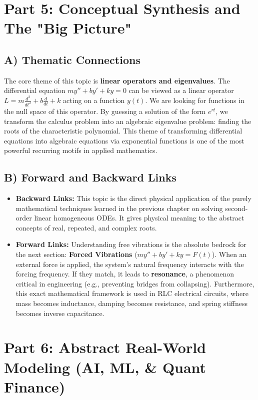 \documentclass[11pt]{article}
\begin{document}
\newpage
\section{Part 5: Conceptual Synthesis and The "Big Picture"}

\subsection{A) Thematic Connections}
The core theme of this topic is \textbf{linear operators and eigenvalues}. The differential equation $my'' + by' + ky = 0$ can be viewed as a linear operator $L = m\frac{d^2}{dt^2} + b\frac{d}{dt} + k$ acting on a function $y(t)$. We are looking for functions in the null space of this operator. By guessing a solution of the form $e^{rt}$, we transform the calculus problem into an algebraic eigenvalue problem: finding the roots of the characteristic polynomial. This theme of transforming differential equations into algebraic equations via exponential functions is one of the most powerful recurring motifs in applied mathematics.

\subsection{B) Forward and Backward Links}
\begin{itemize}
    \item \textbf{Backward Links:} This topic is the direct physical application of the purely mathematical techniques learned in the previous chapter on solving second-order linear homogeneous ODEs. It gives physical meaning to the abstract concepts of real, repeated, and complex roots.
    \item \textbf{Forward Links:} Understanding free vibrations is the absolute bedrock for the next section: \textbf{Forced Vibrations} ($my'' + by' + ky = F(t)$). When an external force is applied, the system's natural frequency interacts with the forcing frequency. If they match, it leads to \textbf{resonance}, a phenomenon critical in engineering (e.g., preventing bridges from collapsing). Furthermore, this exact mathematical framework is used in RLC electrical circuits, where mass becomes inductance, damping becomes resistance, and spring stiffness becomes inverse capacitance.
\end{itemize}

\newpage
\section{Part 6: Abstract Real-World Modeling (AI, ML, \& Quant Finance)}
\end{document}
